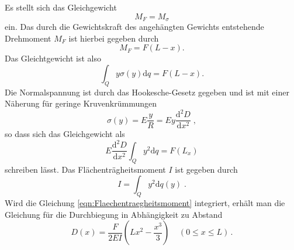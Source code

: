 Es stellt sich das Gleichgewicht
\begin{equation*}
  M_F=M_\sigma
\end{equation*}
ein. Das durch die Gewichtskraft des angehängten Gewichts entstehende Drehmoment
$M_F$ ist hierbei gegeben durch
\begin{equation*}
  M_F=F(L-x).
\end{equation*}
Das Gleichtgewicht ist also
\begin{equation}
  \int_Q y\sigma(y)\text{d}q=F(L-x).
\end{equation}
Die Normalspannung ist durch das Hookesche-Gesetz gegeben und ist mit einer Näherung
für geringe Kruvenkrümmungen
\begin{equation*}
  \sigma(y)=E\frac{y}{R}=Ey\frac{\text{d}^2D}{\text{d}x^2}\;,
\end{equation*}
so dass sich das Gleichgewicht als
\begin{equation*}
  E\frac{\text{d}^2D}{\text{d}x^2}\int_Q y^2\text{d}q=F(L_x)
\end{equation*}
schreiben lässt. Das Flächenträgheitsmoment $I$ ist gegeben durch
\begin{equation}
  I=\int_Q y^2 \text{d}q(y)\;.
  \label{eqn:Flaechentraegheitsmoment}
\end{equation}
Wird die Gleichung \eqref{eqn:Flaechentraegheitsmoment} integriert, erhält man die
Gleichung für die Durchbiegung in Abhängigkeit zu Abstand
\begin{equation}
  D(x)=\frac{F}{2EI}\left(Lx^2-\frac{x^3}{3}\right)\;\;\;\;(0\le x \le L)\,.
  \label{eqn:durchbiegung1}
\end{equation}

